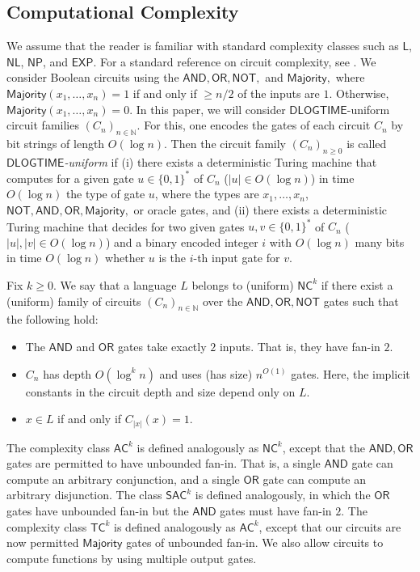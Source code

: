 \documentclass{theoretics}
\newcommand*{\ComplexityClass}[1]{\ensuremath{\mathsf{#1}}\xspace}
\newcommand*{\NL}{\ComplexityClass{NL}}
\newcommand*{\NP}{\ComplexityClass{NP}}
\newcommand*{\EXP}{\ComplexityClass{EXP}}
\newcommand{\AC}{\ComplexityClass{AC}}
\newcommand{\SAC}{\ComplexityClass{SAC}}
\newcommand{\DLOGTIME}{\ComplexityClass{DLOGTIME}} %
\newcommand{\LOGSPACE}{\ComplexityClass{L}} %
\begin{document}
\subsection{Computational Complexity} \label{sec:Complexity}
We assume that the reader is familiar with standard complexity classes such as \LOGSPACE, \NL, \NP, and \EXP. For a standard reference on circuit complexity, see \cite{VollmerText}. We consider Boolean circuits using the $\mathsf{AND}, \mathsf{OR}, \mathsf{NOT},$ and $\mathsf{Majority},$ where $\mathsf{Majority}(x_{1}, \ldots, x_{n}) = 1$ if and only if $\geq n/2$ of the inputs are $1$. Otherwise, $\mathsf{Majority}(x_{1}, \ldots, x_{n}) = 0$. In this paper, we will consider $\mathsf{DLOGTIME}$-uniform circuit families $(C_{n})_{n \in \mathbb{N}}$. For this,
one encodes the gates of each circuit $C_n$ by bit strings of length $O(\log n)$. Then the circuit family $(C_n)_{n \geq 0}$
is called \emph{\DLOGTIME-uniform}  if (i) there exists a deterministic Turing machine that computes for a given gate $u \in \{0,1\}^*$
of $C_n$ ($|u| \in O(\log n)$) in time $O(\log n)$ the type of gate $u$, where the types are $x_1, \ldots, x_n$, $\mathsf{NOT}, \mathsf{AND}, \mathsf{OR}, \mathsf{Majority},$ or oracle gates,
and (ii) there exists a deterministic Turing machine that decides for two given gates $u,v \in \{0,1\}^*$
of $C_n$ ($|u|, |v| \in O(\log n)$) and a binary encoded integer $i$ with $O(\log n)$ many bits
in time $O(\log n)$ whether $u$ is the $i$-th input gate for $v$.


\begin{definition}
Fix $k \geq 0$. We say that a language $L$ belongs to (uniform) $\mathsf{NC}^{k}$ if there exist a (uniform) family of circuits $(C_{n})_{n \in \mathbb{N}}$ over the $\mathsf{AND}, \mathsf{OR}, \mathsf{NOT}$ gates such that the following hold:
\begin{itemize}
\item The $\mathsf{AND}$ and $\mathsf{OR}$ gates take exactly $2$ inputs. That is, they have fan-in $2$.
\item $C_{n}$ has depth $O(\log^{k} n)$ and uses (has size) $n^{O(1)}$ gates. Here, the implicit constants in the circuit depth and size depend only on $L$.

\item $x \in L$ if and only if $C_{|x|}(x) = 1$. 
\end{itemize}
\end{definition}


\noindent The complexity class $\AC^{k}$ is defined analogously as $\mathsf{NC}^{k}$, except that the $\mathsf{AND}, \mathsf{OR}$ gates are permitted to have unbounded fan-in.
That is, a single $\mathsf{AND}$ gate can compute an arbitrary conjunction, and a single $\mathsf{OR}$ gate can compute an arbitrary disjunction. The class $\SAC^k$ is defined analogously, in which the $\mathsf{OR}$ gates have unbounded fan-in but the $\mathsf{AND}$ gates must have fan-in $2$.
The complexity class $\mathsf{TC}^{k}$ is defined analogously as $\AC^{k}$, except that our circuits are now permitted $\mathsf{Majority}$ gates of unbounded fan-in.
We also allow circuits to compute functions by using multiple output gates. 
\end{document}
